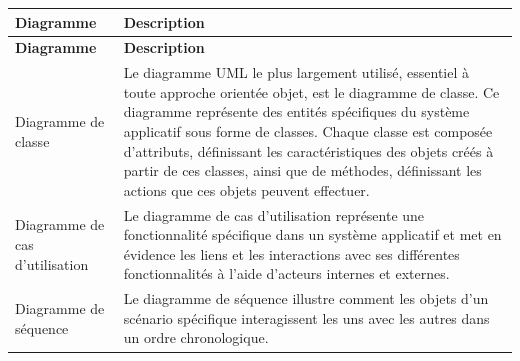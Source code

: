\begin{longtable}[c]{|p{}|p{}|}
  \hline
  \textbf{Diagramme}             & \textbf{Description}                                                                                                                                                                                                                                                                                                                                                                                                \\
  \hline
  \endfirsthead
  \hline
  \textbf{Diagramme}             & \textbf{Description}                                                                                                                                                                                                                                                                                                                                                                                                \\
  \hline
  \endhead
  \hline
  \endlastfoot
  Diagramme de classe            & Le diagramme UML le plus largement utilisé, essentiel à toute approche orientée objet, est le diagramme de classe. Ce diagramme représente des entités spécifiques du système applicatif sous forme de classes. Chaque classe est composée d'attributs, définissant les caractéristiques des objets créés à partir de ces classes, ainsi que de méthodes, définissant les actions que ces objets peuvent effectuer. \\
  \hline
  Diagramme de cas d'utilisation & Le diagramme de cas d'utilisation représente une fonctionnalité spécifique dans un système applicatif et met en évidence les liens et les interactions avec ses différentes fonctionnalités à l'aide d'acteurs internes et externes.                                                                                                                                                                                \\
  \hline
  Diagramme de séquence          &
  Le diagramme de séquence illustre comment les objets d'un scénario spécifique interagissent les uns avec les autres dans un ordre chronologique.                                                                                                                                                                                                                                                                                                     \\
  \hline
\end{longtable}

